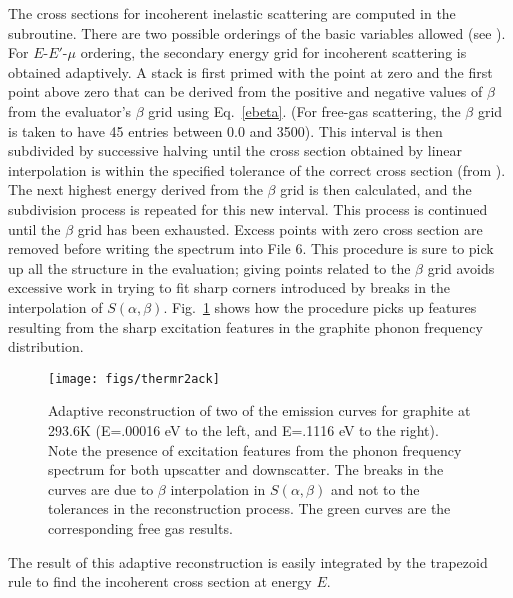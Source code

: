 The cross sections for incoherent inelastic scattering are computed
in the  subroutine.  There
are two possible orderings of the basic variables allowed (see
).  For $E$-$E'$-$\mu$ ordering, the secondary energy grid
for incoherent scattering is obtained adaptively.  A stack is first primed
with the point at zero and the first point above zero that can be derived
from the positive and negative values of $\beta$ from the evaluator's
$\beta$ grid using Eq.~\ref{ebeta}.  (For free-gas scattering, the
$\beta$ grid is taken to have 45 entries between 0.0 and 3500).
This interval is then subdivided by successive halving until the
cross section obtained by linear interpolation is within the specified
tolerance of the correct cross section (from
). The next
highest energy derived from the $\beta$ grid is then calculated,
and the subdivision process is repeated for this new interval.
This process is continued until the $\beta$ grid has been exhausted.
Excess points with zero cross section are removed before writing
the spectrum into File 6.  This procedure is sure to pick up all the
structure in the evaluation; giving points related to the $\beta$
grid avoids excessive work in trying to fit sharp corners introduced by
breaks in the interpolation of $S(\alpha,\beta)$.  Fig.~\ref{graph}
shows how the procedure picks up features resulting from the sharp
excitation features in the graphite phonon frequency distribution.

\begin{figure}[thb]\centering
\texttt{[image: figs/thermr2ack]}
  \caption[Adaptive reconstruction of emission spectra (graphite)]{Adaptive
 reconstruction of two of the emission curves for graphite at 293.6K
 (E=.00016 eV to the left, and E=.1116 eV to the right).  Note the
 presence of excitation features from the phonon frequency spectrum
 for both upscatter and downscatter.  The breaks in the curves are due
 to $\beta$ interpolation in $S(\alpha,\beta)$ and not to the tolerances
 in the reconstruction process.  The green curves are the corresponding
 free gas results.}
\label{graph}
\end{figure}

The result of this adaptive reconstruction is easily integrated by the
trapezoid rule to find the incoherent cross section at energy $E$.

